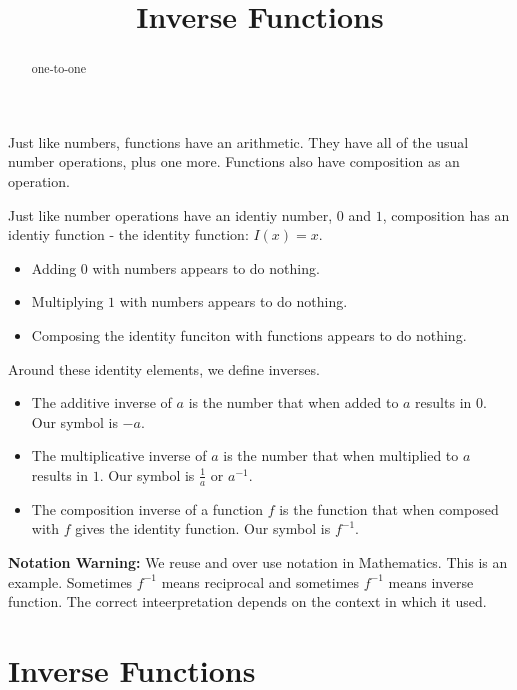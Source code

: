\documentclass{ximera}
\title{Inverse Functions}
\begin{document}
\begin{abstract}
one-to-one
\end{abstract}
\maketitle





Just like numbers, functions have an arithmetic.  They have all of the usual number operations, plus one more.  Functions also have composition as an operation.

Just like number operations have an identiy number, $0$ and $1$, composition has an identiy function - the identity function: $I(x) = x$.


\begin{itemize}
\item Adding $0$ with numbers appears to do nothing.
\item Multiplying $1$ with numbers appears to do nothing.
\item Composing the identity funciton with functions appears to do nothing.
\end{itemize}


Around these identity elements, we define inverses.






\begin{itemize}
\item The additive inverse of $a$ is the number that when added to $a$ results in $0$.  Our symbol is $-a$.
\item The multiplicative inverse of $a$ is the number that when multiplied to $a$ results in $1$.  Our symbol is $\frac{1}{a}$ or $a^{-1}$.
\item The composition inverse of a function $f$ is the function that when composed with $f$ gives the identity function. Our symbol is $f^{-1}$.
\end{itemize}


\textbf{Notation Warning:} We reuse and over use notation in Mathematics.  This is an example.  Sometimes $f^{-1}$ means reciprocal and sometimes $f^{-1}$ means inverse function.  The correct inteerpretation depends on the context in which it used.








\section{Inverse Functions}
\end{document}
